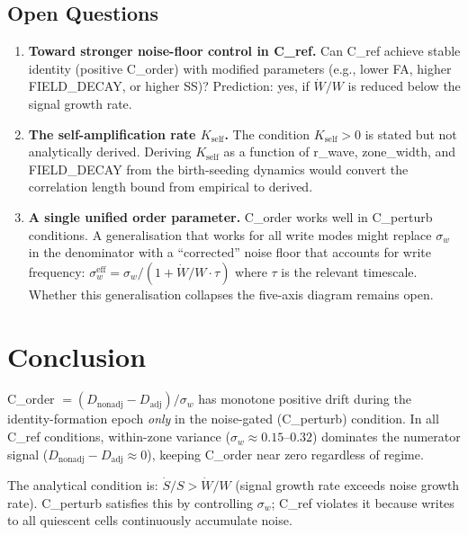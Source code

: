 \documentclass[11pt,a4paper]{article}
\begin{document}
\subsection{Open Questions}

\begin{enumerate}
  \item \textbf{Toward stronger noise-floor control in C\_ref.}
    Can C\_ref achieve stable identity (positive C\_order) with modified parameters
    (e.g., lower FA, higher FIELD\_DECAY, or higher SS)?
    Prediction: yes, if $\dot{W}/W$ is reduced below the signal growth rate.

  \item \textbf{The self-amplification rate $K_\mathrm{self}$.}
    The condition $K_\mathrm{self} > 0$ is stated but not analytically derived.
    Deriving $K_\mathrm{self}$ as a function of r\_wave, zone\_width, and
    FIELD\_DECAY from the birth-seeding dynamics would convert the correlation
    length bound from empirical to derived.

  \item \textbf{A single unified order parameter.}
    C\_order works well in C\_perturb conditions.
    A generalisation that works for all write modes might replace
    $\sigma_w$ in the denominator with a ``corrected'' noise floor
    that accounts for write frequency: $\sigma_w^\mathrm{eff} = \sigma_w / (1 + \dot{W}/W \cdot \tau)$
    where $\tau$ is the relevant timescale.
    Whether this generalisation collapses the five-axis diagram remains open.
\end{enumerate}

\section{Conclusion}

C\_order $= (D_\mathrm{nonadj} - D_\mathrm{adj}) / \sigma_w$ has monotone
positive drift during the identity-formation epoch \emph{only} in the
noise-gated (C\_perturb) condition.
In all C\_ref conditions, within-zone variance ($\sigma_w \approx 0.15$--$0.32$)
dominates the numerator signal ($D_\mathrm{nonadj} - D_\mathrm{adj} \approx 0$),
keeping C\_order near zero regardless of regime.

The analytical condition is: $\dot{S}/S > \dot{W}/W$ (signal growth rate
exceeds noise growth rate).
C\_perturb satisfies this by controlling $\sigma_w$;
C\_ref violates it because writes to all quiescent cells continuously
accumulate noise.
\end{document}
